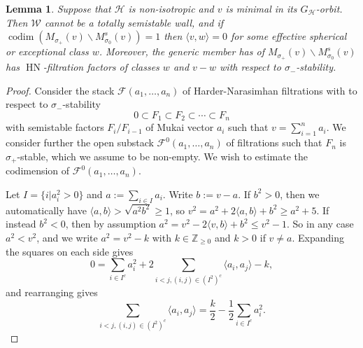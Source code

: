 \documentclass[leqno,11pt]{amsart}
\def\Z{\ensuremath{\mathbb{Z}}}
\def\codim{\mathop{\mathrm{codim}}\nolimits}
\def\HN{\mathop{\mathrm{HN}}\nolimits}
\newtheorem{Lem}[Thm]{Lemma}
\theoremstyle{definition}
\def\Z{\ensuremath{\mathbb{Z}}}
\def\FF{\ensuremath{\mathcal F}}
\def\HH{\ensuremath{\mathcal H}}
\def\WW{\ensuremath{\mathcal W}}
\begin{document}
\begin{Lem}\label{Lem:non-isotropic no totally semistable wall}Suppose that $\HH$ is non-isotropic and $v$ is minimal in its $G_{\HH}$-orbit.  Then $\WW$ cannot be a totally semistable wall, and if $\codim(M_{\sigma_+}(v)\backslash M^s_{\sigma_0}(v))=1$ then $\langle v,w\rangle=0$ for some effective spherical or exceptional class $w$.  Moreover, the generic member has of $M_{\sigma_+}(v)\backslash M^s_{\sigma_0}(v)$ has $\HN$-filtration factors of classes $w$ and $v-w$ with respect to $\sigma_-$-stability.
\end{Lem}
\begin{proof}
Consider the stack $\FF(a_1,\ldots,a_n)$ of Harder-Narasimhan filtrations with to respect to $\sigma_-$-stability $$0\subset F_1\subset F_2\subset \cdots\subset F_n$$ with semistable factors $F_i/F_{i-1}$ of Mukai vector $a_i$ such that $v=\sum_{i=1}^n a_i$.  We consider further the open substack $\FF^0(a_1,\ldots,a_n)$ of filtrations such that $F_n$ is $\sigma_+$-stable, which we assume to be non-empty.  We wish to estimate the codimension of $\FF^0(a_1,\ldots,a_n)$.    

Let $I=\{i|a_i^2>0\}$ and $a:=\sum_{i\in I}a_i$.  Write $b:=v-a$.  If $b^2>0$, then we automatically have $\langle a,b\rangle>\sqrt{a^2 b^2}\geq 1$, so $v^2=a^2+2\langle a,b\rangle+b^2\geq a^2+5$.  If instead $b^2<0$, then by assumption $a^2=v^2-2\langle v,b\rangle+b^2\leq v^2-1$.  So in any case $a^2<v^2$, and we write $a^2=v^2-k$ with $k\in\Z_{\geq 0}$ and $k>0$ if $v\neq a$.  Expanding the squares on each side gives $$0=\sum_{i\in I^c}a_i^2+2\sum_{i<j,(i,j)\in (I^2)^c}\langle a_i,a_j\rangle-k,$$ and rearranging gives \begin{equation}\label{non-isotropic estimate}
\sum_{i<j,(i,j)\in (I^2)^c}\langle a_i,a_j\rangle =\frac{k}{2} -\frac{1}{2}\sum_{i\in I^c}a_i^2.\end{equation}


\end{proof}
\end{document}
